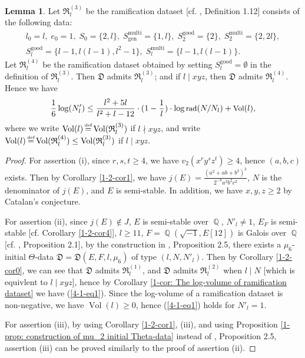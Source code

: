 \documentclass[a4paper, 12pt]{article}
\DeclareMathOperator{\defeq}{\overset{\text{\tiny{def}}}{=}}
\DeclareMathOperator{\Q}{\mathbb{Q}}
\DeclareMathOperator{\rad}{\text{rad}}
\DeclareMathOperator{\good}{\text{good}}
\DeclareMathOperator{\multi}{\text{multi}}
\DeclareMathOperator{\gen}{\text{gen}}
\DeclareMathOperator{\Vol}{\text{Vol}}
\numberwithin{equation}{section}
\theoremstyle{definition}
\newtheorem{lem}[thm]{Lemma}
\begin{document}
\begin{lem}
Let $\mathfrak{R}_l^{(3)}$ be the ramification dataset [cf. \cite{Diophantine_after_IUT_I}, Definition 1.12] consists of the following data:
\begin{gather*}
l_0 = l, \;  e_0 = 1, \; S_0=\{2,l\}, \; S_{\gen}^{\multi} = \{1,l\}, \; S_2^{\good} = \{2\}, \; 
S_2^{\multi} = \{2,2l\}, \\
S_l^{\good} = \{l-1, l(l-1), l^2-1\}, \;   S_l^{\multi} = \{l-1, l(l-1)\} .
\end{gather*}
Let $\mathfrak{R}_l^{(4)}$ be the ramification dataset obtained by setting $S_l^{\good} = \emptyset$ in the definition of $\mathfrak{R}_l^{(3)}$.
Then $\mathfrak D$ admits $\mathfrak R_l^{(3)}$; and if $l\mid xyz$, then $\mathfrak D$ admits $\mathfrak R_l^{(4)}$.
Hence we have 
\begin{equation} \small \label{2-1-eq2}
    \frac{1}{6}\log(N'_l) \le  \frac{l^2+5l}{l^2+l-12}\cdot (1-\frac{1}{l})\cdot \log\rad(N/N_l)  + \Vol(l) ,
\end{equation}
where we write $\Vol(l) \defeq \Vol(\mathfrak R_l^{(3)})$ if $l\nmid xyz$, and write $\Vol(l) \defeq \Vol(\mathfrak R_l^{(4)}) \le \Vol(\mathfrak R_l^{(3)})$ if $l\mid xyz$.

\end{lem}
\begin{proof}
For assertion (i), since $r,s,t \ge 4$, we have $v_2(x^r y^s z^t) \ge 4$, hence $(a,b,c)$ exists. Then by Corollary \ref{1-2-cor1}, we have $j(E) = \frac{(a^2+ab+b^2)^3}{2^{-8}a^2b^2c^2}$, $N$ is the denominator of $j(E)$, and $E$ is semi-stable. In addition, we have $x,y,z \ge 2$ by Catalan's conjecture.

For assertion (ii), since $j(E) \notin J$, $E$ is semi-stable over $\Q$, $N'_l \neq 1$, $E_F$ is semi-stable [cf. Corollary \ref{1-2-cor4}], $l\ge 11$, $F = \Q(\sqrt{-1}, E[12])$ is Galois over $\Q$ [cf. \cite{Diophantine_after_IUT_I}, Proposition 2.1],
by the construction in \cite{Diophantine_after_IUT_I}, Proposition 2.5, there exists a $\mu_6$-initial $\Theta$-data $\mathfrak D = \mathfrak D(E,F,l,\mu_6)$ of type $(l, N, N'_l)$. Then by Corollary \ref{1-2-cor0}, we can see that $\mathfrak D$ admits $\mathfrak R_l^{(1)}$, and $\mathfrak D$ admits $\mathfrak R_l^{(2)}$ when $l\mid N$ [which is equivlent to $l\mid xyz$], hence by Corollary \ref{1-cor: The log-volume of ramification dataset} we have (\ref{4-1-eq1}). Since the log-volume of a ramification dataset is non-negative, we have $\Vol(l) \ge 0$, hence  (\ref{4-1-eq1}) holds for $N'_l = 1$.

For assertion (iii), by using Corollary \ref{1-2-cor1}, (iii), and using Proposition \ref{1-prop: construction of mu_2 initial Theta-data} instead of \cite{Diophantine_after_IUT_I}, Proposition 2.5,
assertion (iii) can be proved similarly to the proof of assertion (ii).

\end{proof}
\end{document}
